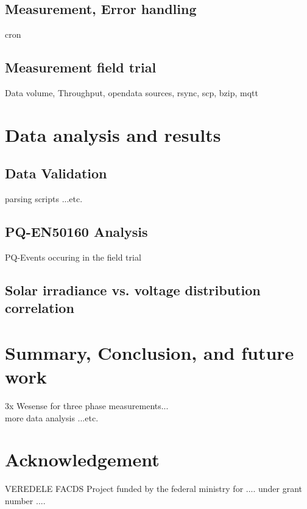 \documentclass{sig-alternate}
\begin{document}
		\subsection{Measurement,  Error handling}
			cron
		\subsection{Measurement field trial}
			Data volume, Throughput, opendata sources, rsync, scp, bzip, mqtt

        \section{Data analysis and results}
		
		\subsection{Data Validation}
			parsing scripts ...etc.
		
		\subsection{PQ-EN50160 Analysis}
			PQ-Events occuring in the field trial

		\subsection{Solar irradiance vs. voltage distribution correlation}


	\section{Summary, Conclusion, and future work}
	3x Wesense for three phase measurements... \\
	more data analysis ...etc.

	\section{Acknowledgement}
	VEREDELE FACDS Project funded by the federal ministry for .... under grant number ....


	{
	
	\small
	
	}

\end{document}
